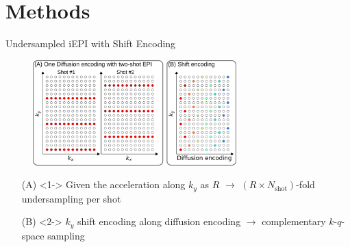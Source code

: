 \documentclass[hyperref={colorlinks=true,linkcolor=blue}, aspectratio=169]{beamer}
\begin{document}
	\section{Methods}
	
	\begin{frame}{Undersampled iEPI with Shift Encoding}
		\begin{figure}
			\includegraphics[width=0.7\textwidth]{figures/2-shot.png}
		\end{figure}
		\begin{itemize}
			\item [(A)] <1-> Given the acceleration along $k_y$ as $R$ $\rightarrow$ $(R \times N_\mathrm{shot})$-fold undersampling per shot
			\item [(B)] <2-> $k_y$ shift encoding along diffusion encoding $\rightarrow$ complementary $k$-$q$-space sampling
		\end{itemize}
	\end{frame}
\end{document}
